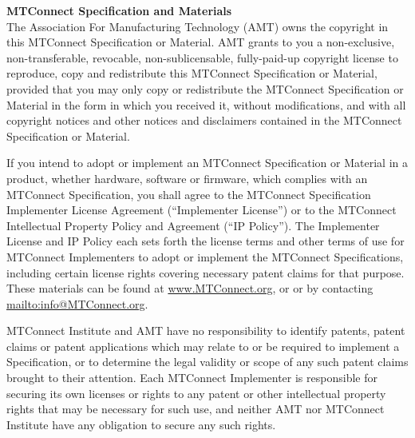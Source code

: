 \documentclass{mtconnect}	%
\begin{document}
\begin{nolinenumbers}
\maketitle				%


\textbf{\color{mtc1}\Large MTConnect Specification and Materials} \\

The Association For Manufacturing Technology (AMT) owns the copyright in this MTConnect Specification or Material. AMT grants to you a non-exclusive, non-transferable, revocable, non-sublicensable, fully-paid-up copyright license to reproduce, copy and redistribute this MTConnect Specification or Material, provided that you may only copy or redistribute the MTConnect Specification or Material in the form in which you received it, without modifications, and with all copyright notices and other notices and disclaimers contained in the MTConnect Specification or Material.

If you intend to adopt or implement an MTConnect Specification or Material in a product, whether hardware, software or firmware, which complies with an MTConnect Specification, you shall agree to the MTConnect Specification Implementer License Agreement (``Implementer License'') or to the MTConnect Intellectual Property Policy and Agreement (``IP Policy''). The Implementer License and IP Policy each sets forth the license terms and other terms of use for MTConnect Implementers to adopt or implement the MTConnect Specifications, including certain license rights covering necessary patent claims for that purpose. These materials can be found at \url{www.MTConnect.org}, or or by contacting \url{mailto:info@MTConnect.org}. 

MTConnect Institute and AMT have no responsibility to identify patents, patent claims or patent applications which may relate to or be required to implement a Specification, or to determine the legal validity or scope of any such patent claims brought to their attention. Each MTConnect Implementer is responsible for securing its own licenses or rights to any patent or other intellectual property rights that may be necessary for such use, and neither AMT nor MTConnect Institute have any obligation to secure any such rights.


\end{nolinenumbers}
\end{document}
